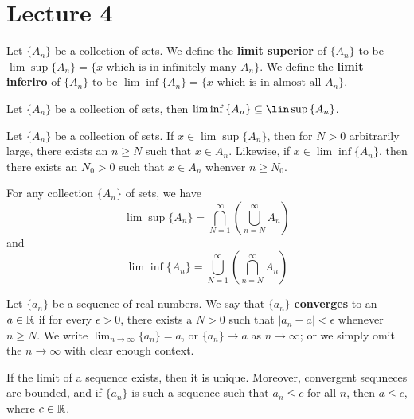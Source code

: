 \section*{Lecture 4}

\begin{definition}
    Let $\{A_n\}$ be a collection of sets. We define the \textbf{limit superior}
    of $\{A_n\}$ to be $\lim\sup{\{A_n\}}=\{x \text{ which is in infinitely many
    } A_n\}$. We define the \textbf{limit inferiro} of $\{A_n\}$ to be
    $\lim\inf{\{A_n\}}=\{x \text{ which is in almost all $A_n$}\}$.
\end{definition}

\begin{lemma}\label{lemma_4.22}
    Let $\{A_n\}$ be a collection of sets, then $\lim\inf{\{A_n\}} \subseteq
    \lin\sup{\{A_n\}}$.
\end{lemma}

\begin{lemma}\label{lemma_4.23}
    Let $\{A_n\}$ be a collection of sets. If $x \in \lim\sup{\{A_n\}}$, then
    for $N>0$ arbitrarily large, there exists an  $n \geq N$ such that  $x \in
    A_n$. Likewise, if  $x \in \lim\inf{\{A_n\}}$, then  there exists an $N_0>0$
    such that $x \in A_n$ whenver  $n \geq N_0$.
\end{lemma}

\begin{lemma}\label{lemma_4.24}
    For any collection $\{A_n\}$ of sets, we have
    \begin{equation}
        \lim\sup{\{A_n\}}=\bigcap_{N=1}^\infty{(\bigcup_{n=N}^\infty{A_n})}
    \end{equation}
    and
    \begin{equation}
        \lim\inf{\{A_n\}}=\bigcup_{N=1}^\infty{(\bigcap_{n=N}^\infty{A_n})}
    \end{equation}
\end{lemma}

\begin{definition}
    Let $\{a_n\}$ be a sequence of real numbers. We say that $\{a_n\}$
    \textbf{converges} to an $a \in \mathbb{R}$ if for every  $\epsilon>0$, there exists
    a  $N>0$ such that $|a_n-a|<\epsilon$ whenever $n \geq N$. We write
    $\lim_{n \xrightarrow{} \infty}{\{a_n\}}=a$, or $\{a_n\} \xrightarrow{} a$
    as $n \xrightarrow{} \infty$; or we simply omit the $n \xrightarrow{}
    \infty$ with clear enough context.
\end{definition}

\begin{lemma}\label{lemma_4.25}
    If the limit of a sequence exists, then it is unique. Moreover, convergent
    sequneces are bounded, and if $\{a_n\}$ is such a sequence such that $a_n
    \leq c$ for all  $n$, then  $a \leq c$, where  $c \in \mathbb{R}$.
\end{lemma}

